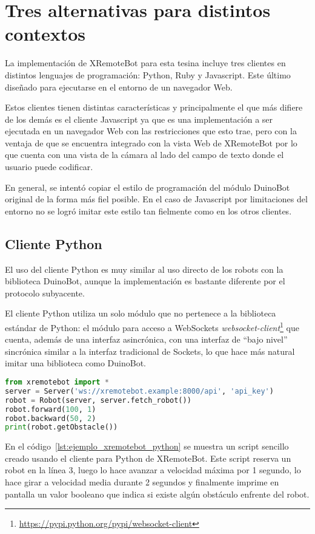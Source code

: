 \chapter{Tres alternativas para distintos contextos}\label{cha:clientes}

La implementación de XRemoteBot para esta tesina incluye tres clientes en distintos
lenguajes de programación: Python, Ruby y Javascript. Este último diseñado para ejecutarse
en el entorno de un navegador Web.

Estos clientes tienen distintas características y principalmente el que más difiere
de los demás es el cliente Javascript ya que es una implementación a ser ejecutada
en un navegador Web con las restricciones que esto trae, pero con la ventaja de que
se encuentra integrado con la vista Web de XRemoteBot por lo que cuenta con una
vista de la cámara al lado del campo de texto donde el usuario puede codificar.

En general, se intentó copiar el estilo de programación del módulo DuinoBot original
de la forma más fiel posible. En el caso de Javascript por limitaciones del entorno
no se logró imitar este estilo tan fielmente como en los otros clientes.

\section{Cliente Python}\label{sec:python}
El uso del cliente Python es muy similar al uso directo de los robots con la
biblioteca DuinoBot, aunque la implementación es bastante diferente por el protocolo
subyacente.

El cliente Python utiliza un solo módulo que no pertenece a la biblioteca estándar
de Python: el módulo para acceso a WebSockets
\textit{websocket-client}\footnote{\url{https://pypi.python.org/pypi/websocket-client}}
que cuenta, además de una interfaz asincrónica, con una interfaz de ``bajo nivel''
sincrónica similar a la interfaz tradicional de Sockets, lo que hace más
natural imitar una biblioteca como DuinoBot.

\begin{lstlisting}[language=Python,
caption={Ejemplo con XRemoteBot para Python},label=lst:ejemplo_xremotebot_python]
from xremotebot import *
server = Server('ws://xremotebot.example:8000/api', 'api_key')
robot = Robot(server, server.fetch_robot())
robot.forward(100, 1)
robot.backward(50, 2)
print(robot.getObstacle())
\end{lstlisting}

En el código~\ref{lst:ejemplo_xremotebot_python} se muestra
un script sencillo creado usando el cliente para Python de XRemoteBot. Este
script reserva un robot en la línea 3, luego lo hace avanzar
a velocidad máxima por 1 segundo, lo hace girar a velocidad media
durante 2 segundos y finalmente imprime en pantalla un valor booleano
que indica si existe algún obstáculo enfrente del robot.

